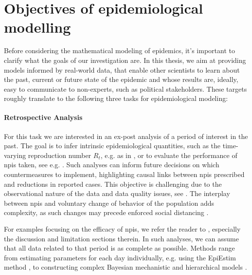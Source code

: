 \section{Objectives of epidemiological modelling}
\label{sec:objectives}

Before considering the mathematical modeling of epidemics, it's important to clarify what the goals of our investigation are. In this thesis, we aim at providing models informed by real-world data, that enable other scientists to learn about the past, current or future state of the epidemic and whose results are, ideally, easy to communicate to non-experts, such as political stakeholders.
These targets roughly translate to the following three tasks for epidemiological modeling:

\paragraph{Retrospective Analysis}
For this task we are interested in an ex-post analysis of a period of interest in the past. The goal is to infer intrinsic epidemiological quantities, such as the time-varying reproduction number $R_{t}$, e.g. as in  \citep{Abbott2020Estimating}, or to evaluate the performance of \glspl{npi} taken, see e.g. \citep{Flaxman2020Estimating,Brauner2021Inferring,Khazaei2023Using}. Such analyses can inform future decisions on which countermeasures to implement, highlighting causal links between \glspl{npi} prescribed and reductions in reported cases. This objective is challenging due to the observational nature of the data and data quality issues, see . The interplay between \glspl{npi} and voluntary change of behavior of the population adds complexity, as such changes may precede enforced social distancing \citep{Gupta2020Mandated}. 

For examples focusing on the efficacy of \glspl{npi}, we refer the reader to \citep{Flaxman2020Estimating,Brauner2021Inferring,Khazaei2023Using}, especially the discussion and limitation sections therein. 
In such analyses, we can assume that all data related to that period is as complete as possible.
Methods range from estimating parameters for each day individually, e.g. using the EpiEstim \citep{Cori2021EpiEstim} method \citep{Abbott2020Estimating}, to constructing complex Bayesian mechanistic \citep{Flaxman2020Estimating} and hierarchical models \citep{Brauner2021Inferring,Khazaei2023Using}. 

